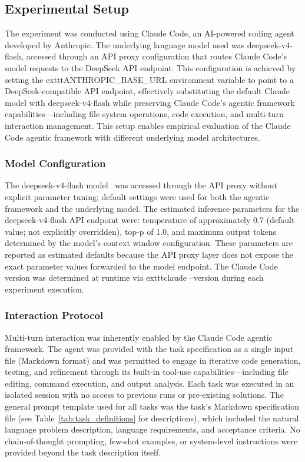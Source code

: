 \documentclass[conference]{IEEEtran}
\begin{document}
\subsection{Experimental Setup}

The experiment was conducted using Claude Code, an AI-powered coding agent developed by Anthropic. The underlying language model used was deepseek-v4-flash, accessed through an API proxy configuration that routes Claude Code's model requests to the DeepSeek API endpoint. This configuration is achieved by setting the 			exttt{ANTHROPIC\_BASE\_URL} environment variable to point to a DeepSeek-compatible API endpoint, effectively substituting the default Claude model with deepseek-v4-flash while preserving Claude Code's agentic framework capabilities---including file system operations, code execution, and multi-turn interaction management. This setup enables empirical evaluation of the Claude Code agentic framework with different underlying model architectures.

\subsubsection{Model Configuration}

The deepseek-v4-flash model~\cite{deepseek2026api} was accessed through the API proxy without explicit parameter tuning; default settings were used for both the agentic framework and the underlying model. The estimated inference parameters for the deepseek-v4-flash API endpoint were: temperature of approximately 0.7 (default value; not explicitly overridden), top-p of 1.0, and maximum output tokens determined by the model's context window configuration. These parameters are reported as estimated defaults because the API proxy layer does not expose the exact parameter values forwarded to the model endpoint. The Claude Code version was determined at runtime via 			exttt{claude --version} during each experiment execution.

\subsubsection{Interaction Protocol}

Multi-turn interaction was inherently enabled by the Claude Code agentic framework. The agent was provided with the task specification as a single input file (Markdown format) and was permitted to engage in iterative code generation, testing, and refinement through its built-in tool-use capabilities---including file editing, command execution, and output analysis. Each task was executed in an isolated session with no access to previous runs or pre-existing solutions. The general prompt template used for all tasks was the task's Markdown specification file (see Table~\ref{tab:task_definitions} for descriptions), which included the natural language problem description, language requirements, and acceptance criteria. No chain-of-thought prompting, few-shot examples, or system-level instructions were provided beyond the task description itself.
\end{document}
